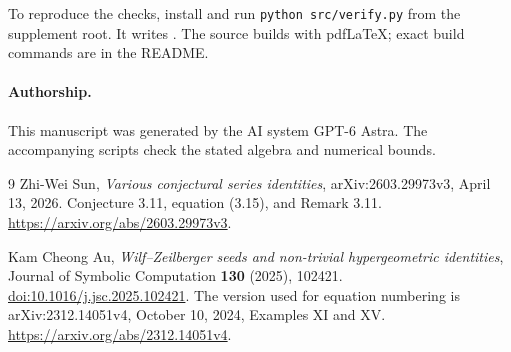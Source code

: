 \documentclass[11pt]{article}
\begin{document}
To reproduce the checks, install  and run
\texttt{python src/verify.py} from the supplement root. It writes
. The source 
builds with pdfLaTeX; exact build commands are in the README.

\paragraph{Authorship.}
This manuscript was generated by the AI system GPT-6 Astra.
The accompanying scripts check the stated algebra and numerical bounds.

\begin{thebibliography}{9}
Zhi-Wei Sun,
\emph{Various conjectural series identities},
arXiv:2603.29973v3, April 13, 2026.
Conjecture 3.11, equation (3.15), and Remark 3.11.
\url{https://arxiv.org/abs/2603.29973v3}.

Kam Cheong Au,
\emph{Wilf--Zeilberger seeds and non-trivial hypergeometric identities},
Journal of Symbolic Computation \textbf{130} (2025), 102421.
\href{https://doi.org/10.1016/j.jsc.2025.102421}{doi:10.1016/j.jsc.2025.102421}.
The version used for equation numbering is arXiv:2312.14051v4,
October 10, 2024, Examples XI and XV.
\url{https://arxiv.org/abs/2312.14051v4}.
\end{thebibliography}
\end{document}
